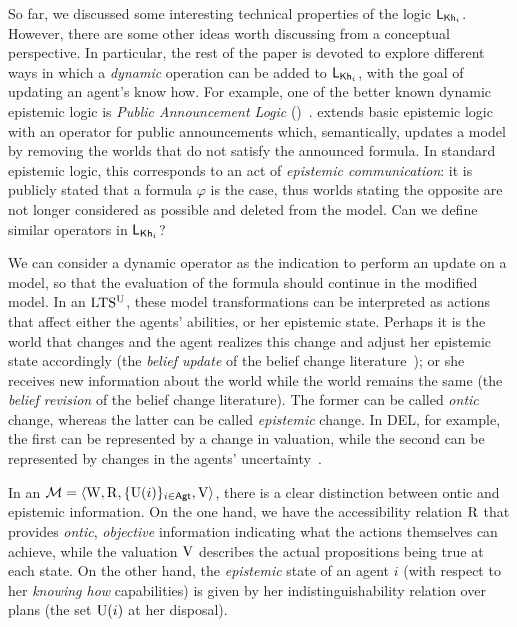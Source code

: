 So far, we discussed some interesting technical properties of the logic $\mathsf{L}_{{\sf Kh}_i}$. However, there are some other ideas worth discussing from a conceptual perspective. In particular, the rest of the paper is devoted to explore different ways in which a \emph{dynamic} operation can be added to $\mathsf{L}_{{\sf Kh}_i}$, with the goal of updating an agent's know how.   For example, one of the better known dynamic epistemic logic is \emph{Public Announcement Logic} (\PAL)~\cite{Plaza89:lopc}.  \PAL extends basic epistemic logic with an operator for public announcements which, semantically, updates a model by removing the worlds that do not satisfy the announced formula. In standard epistemic logic, this corresponds to an act of \emph{epistemic communication}: it is publicly stated that a formula $\varphi$ is the case, thus worlds stating the opposite are not longer considered as possible and deleted from the model.  Can we define similar operators in $\mathsf{L}_{{\sf Kh}_i}$?

We can consider a dynamic operator as the indication to perform an update on a model, so that the evaluation of the formula should continue in the modified model.  In an $\textup{LTS$^\text{\textup{U}}$}$, these model transformations can be interpreted as actions that affect either the agents' abilities, or her epistemic state. 
Perhaps it is the world that changes and the agent realizes this change and adjust her epistemic state accordingly (the \emph{belief update} of the belief change literature~\cite{sep-logic-belief-revision}); or she receives new information about the world while the world remains the same (the \emph{belief revision} of the belief change literature). The former can be called \emph{ontic} change, whereas the latter can be called \emph{epistemic} change. In DEL, for example, the first can be represented by a change in valuation, while the second can be represented by changes in the agents' uncertainty~\cite{vanDitmarschKooi2008}.

In an \ults $\mathcal{M}=\langle \operatorname{W},\operatorname{R},\{ \operatorname{U}(i) \}_{i\in{\rm \sf Agt}},\operatorname{V} \rangle$, there is a clear distinction between ontic and epistemic information. On the one hand, we have the accessibility relation $\operatorname{R}$ that provides \emph{ontic}, \emph{objective} information indicating what the actions themselves can achieve, while the valuation $\operatorname{V}$ describes the actual propositions being true at each state. On the other hand, the \emph{epistemic} state of an agent $i$ (with respect to her \emph{knowing how} capabilities) is given by her indistinguishability relation over plans (the set $\operatorname{U}(i)$ at her disposal). 


